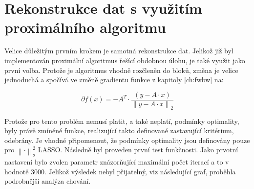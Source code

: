 \documentclass[FM,BP]{tulthesis}
\newcounter{Vzorce}
\begin{document}
\section{Rekonstrukce dat s využitím proximálního algoritmu}
\label{subch:l2Prox} 
Velice důležitým prvním krokem je samotná rekonstrukce dat. Jelikož již byl implementován proximální algoritmus řešící obdobnou úlohu, je také využit jako první volba. Protože je algoritmus vhodně rozčleněn do bloků, změna je velice jednoduchá a spočívá ve změně gradientu funkce z kapitoly \ref{ch:fwbw} na: 

\begin{equation} \label{eq:l2Grad}  \tag{Vzorec \theVzorce}
\partial f(x) = -A^{T} \cdot \frac{\left(y-A \cdot x\right)}{\left\| y - A \cdot x\right\|_{2} }
\end{equation}

Protože pro tento problém nemusí platit, a také neplatí, podmínky optimality, byly právě zmíněné funkce, realizující takto definované zastavující kritérium, odebrány. Je vhodné připomenout, že podmínky optimality jsou definovány pouze pro $\left\| \cdot \right\|_{2}^{2} $ LASSO. Následně byl proveden první test funkčnosti. Jako prvotní nastavení bylo zvolen parametr znázorňující maximální počet iterací a to v hodnotě 3000. Jelikož výsledek nebyl přijatelný, viz následující graf, proběhla podrobnější analýza chování.
\end{document}
